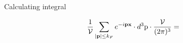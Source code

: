 \begin{frame}{Calculating integral}

  \begin{equation}
    \begin{gathered}
      \frac{1}{\mathcal{V}} \sum_{\abs{\textbf{p}}\leq k_F} e^{- i \textbf{p}\textbf{x}}
      \cdot d^3 \text{p} \cdot \frac{\mathcal{V}}{(2 \pi)^3} = 
    \end{gathered}
  \end{equation}

\end{frame}
